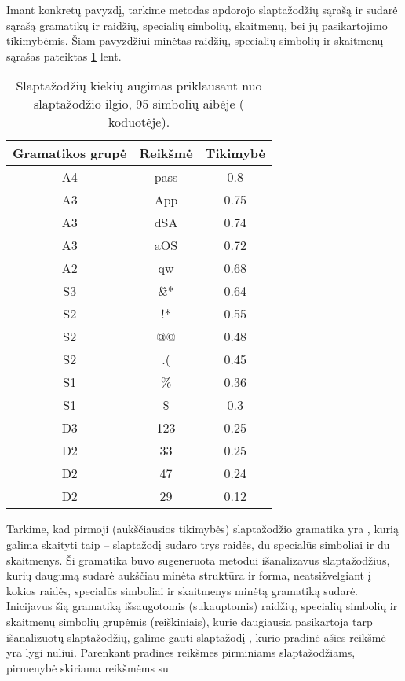 \documentclass{VUMIFInfBakalaurinis}
\begin{document}
Imant konkretų pavyzdį, tarkime metodas apdorojo slaptažodžių sąrašą ir sudarė 
sąrašą gramatikų ir raidžių, specialių simbolių, skaitmenų, bei jų pasikartojimo 
tikimybėmis. Šiam pavyzdžiui minėtas raidžių, specialių simbolių ir skaitmenų 
sąrašas pateiktas \ref{tab:pcfgvalues} lent.
\begin{table}[hb]
  \centering
  \caption{%
    Slaptažodžių kiekių augimas priklausant nuo slaptažodžio ilgio, 95 simbolių 
    aibėje ( koduotėje).
  }
  \begin{tabular}{|c|c|c|}
    \hline \textbf{Gramatikos grupė} & \textbf{Reikšmė} & \textbf{Tikimybė} \\
    \hline A4 & pass & 0.8 \\
    \hline A3 & App & 0.75 \\
    \hline A3 & dSA & 0.74 \\
    \hline A3 & aOS & 0.72 \\
    \hline A2 & qw & 0.68 \\
    \hline S3 & \^\&* & 0.64 \\
    \hline S2 & !* & 0.55 \\
    \hline S2 & @@ & 0.48 \\
    \hline S2 & .( & 0.45 \\
    \hline S1 & \% & 0.36 \\
    \hline S1 & \$ & 0.3 \\
    \hline D3 & 123 & 0.25 \\
    \hline D2 & 33 & 0.25 \\
    \hline D2 & 47 & 0.24 \\
    \hline D2 & 29 & 0.12 \\
    \hline
  \end{tabular}
  \label{tab:pcfgvalues}
\end{table}
Tarkime, kad pirmoji (aukščiausios tikimybės) slaptažodžio gramatika yra 
, kurią galima skaityti taip -- slaptažodį sudaro trys raidės, 
du specialūs simboliai ir du skaitmenys. Ši gramatika buvo sugeneruota metodui 
išanalizavus slaptažodžius, kurių daugumą sudarė aukščiau minėta struktūra ir 
forma, neatsižvelgiant į kokios raidės, specialūs simboliai ir skaitmenys minėtą 
gramatiką sudarė. Inicijavus šią gramatiką išsaugotomis (sukauptomis) raidžių, 
specialių simbolių ir skaitmenų simbolių grupėmis (reiškiniais), kurie 
daugiausia pasikartoja tarp išanalizuotų slaptažodžių, galime gauti slaptažodį 
, kurio pradinė ašies reikšmė yra lygi nuliui. Parenkant 
pradines reikšmes pirminiams slaptažodžiams, pirmenybė skiriama reikšmėms su 
\end{document}
